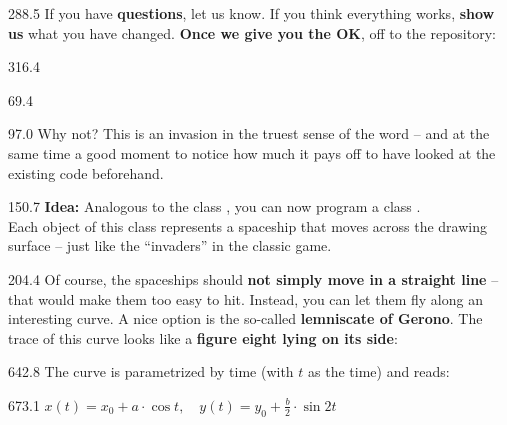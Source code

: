\documentclass{aslab}
\begin{document}
\begin{region}[pitch=14.3]{288.5}
If you have \textbf{questions}, let us know. If you think everything works,
\textbf{show us} what you have changed. \textbf{Once we give you the OK},
off to the repository:
\end{region}

\begin{region}[pitch=13.2]{316.4}
\\
\end{region}

\nextpage
\begin{region}{69.4}
\end{region}

\begin{region}[pitch=13.2]{97.0}
Why not? This is an invasion in the truest sense of the word -- and at the
same time a good moment to notice how much it pays off to have looked at the
existing code beforehand.
\end{region}

\begin{region}[pitch=13.25]{150.7}
\textbf{Idea:} Analogous to the class , you can now program a
class .\\
Each object of this class represents a spaceship that moves across the
drawing surface -- just like the ``invaders'' in the classic game.
\end{region}

\begin{region}[pitch=14.0]{204.4}
Of course, the spaceships should \textbf{not simply move in a straight line}
-- that would make them too easy to hit. Instead, you can let them fly along
an interesting curve. A nice option is the so-called \textbf{lemniscate of
Gerono}. The trace of this curve looks like a \textbf{figure eight lying on
its side}:
\end{region}


\begin{region}{642.8}
The curve is parametrized by time (with $t$ as the time) and reads:
\end{region}

\begin{region}{673.1}
\centering $x(t) = x_0 + a\cdot\cos t,\quad y(t) = y_0 + \tfrac{b}{2}\cdot\sin 2t$
\end{region}
\end{document}
